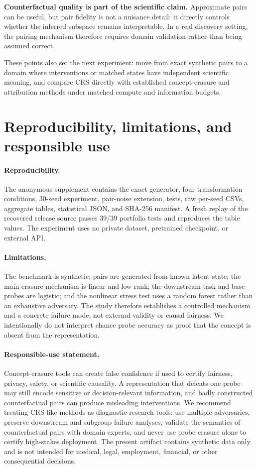 \documentclass{article}
\begin{document}
\textbf{Counterfactual quality is part of the scientific claim.} Approximate pairs can be useful, but pair fidelity is not a nuisance detail: it directly controls whether the inferred subspace remains interpretable. In a real discovery setting, the pairing mechanism therefore requires domain validation rather than being assumed correct.

These points also set the next experiment: move from exact synthetic pairs to a domain where interventions or matched states have independent scientific meaning, and compare CRS directly with established concept-erasure and attribution methods under matched compute and information budgets.

\section{Reproducibility, limitations, and responsible use}
\paragraph{Reproducibility.}
The anonymous supplement contains the exact generator, four transformation conditions, 30-seed experiment, pair-noise extension, tests, raw per-seed CSVs, aggregate tables, statistical JSON, and SHA-256 manifest. A fresh replay of the recovered release source passes 39/39 portfolio tests and reproduces the table values. The experiment uses no private dataset, pretrained checkpoint, or external API.

\paragraph{Limitations.}
The benchmark is synthetic; pairs are generated from known latent state; the main erasure mechanism is linear and low rank; the downstream task and base probes are logistic; and the nonlinear stress test uses a random forest rather than an exhaustive adversary. The study therefore establishes a controlled mechanism and a concrete failure mode, not external validity or causal fairness. We intentionally do not interpret chance probe accuracy as proof that the concept is absent from the representation.

\paragraph{Responsible-use statement.}
Concept-erasure tools can create false confidence if used to certify fairness, privacy, safety, or scientific causality. A representation that defeats one probe may still encode sensitive or decision-relevant information, and badly constructed counterfactual pairs can produce misleading interventions. We recommend treating CRS-like methods as diagnostic research tools: use multiple adversaries, preserve downstream and subgroup failure analyses, validate the semantics of counterfactual pairs with domain experts, and never use probe erasure alone to certify high-stakes deployment. The present artifact contains synthetic data only and is not intended for medical, legal, employment, financial, or other consequential decisions.
\end{document}
